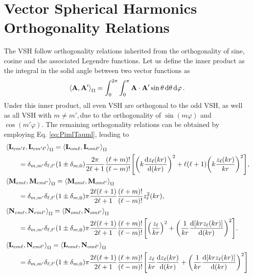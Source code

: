 \section*{Vector Spherical Harmonics Orthogonality Relations}

The VSH follow orthogonality relations inherited from the orthogonality of sine, cosine and the associated Legendre functions. Let us define the inner product as the integral in the solid angle between two vector functions as
%
\begin{align}
\ev{\vb{A},\vb{A}'}_\Omega = \int_0^{2\pi}\int_0^{\pi} \vb{A}\cdot\vb{A}'\sin\theta\dd{\theta}\dd{\varphi}.
\label{eq:inner}
\end{align}
%
Under this inner product, all even VSH are orthogonal to the odd VSH, as well as all VSH  with $m\neq m', $due to the orthogonality of $\sin(m\varphi)$ and $\cos(m'\varphi)$. The remaining orthogonality relations  can be obtained by employing Eq. \eqref{eq:PimlTauml}, leading to
%
\begin{align}
&\ev{\vb{L}_{em'\ell},\vb{L}_{em'\ell'}}_\Omega = \ev{\vb{L}_{om\ell},\vb{L}_{om\ell'}}_\Omega \notag\\
	 &\hspace*{2em} =
 	\delta_{m,m'}\delta_{\ell,\ell'} (1\pm\delta_{m,0})
 	\frac{2\pi}{2\ell+1}\frac{(\ell+m)!}{(\ell-m)!}
 	\qty[\qty(k\dv{z_\ell(kr)}{(kr)})^2 + \ell(\ell+1)\qty(k\frac{z_\ell(kr)}{kr})^2],
    \label{eq:LL}\\
%
&\ev{\vb{M}_{em\ell},\vb{M}_{em\ell'}}_\Omega = \ev{\vb{M}_{om\ell},\vb{M}_{om\ell'}}_\Omega \notag\\
		 &\hspace*{2em} =
	\delta_{m,m'}\delta_{\ell,\ell'} (1\pm\delta_{m,0})
	\pi \frac{2  \ell(\ell+1)}{2\ell+1}\frac{(\ell+m)!}{(\ell-m)!}
	z_{\ell}^2(kr),\\
%
&\ev{\vb{N}_{em\ell},\vb{N}_{em\ell'}}_\Omega = \ev{\vb{N}_{om\ell},\vb{N}_{om\ell'}}_\Omega  \notag\\
	 &\hspace*{2em} =
	 \delta_{m,m'}\delta_{\ell,\ell'} (1\pm\delta_{m,0})
	\pi \frac{2  \ell(\ell+1)}{2\ell+1}\frac{(\ell+m)!}{(\ell-m)!}
	\qty[\qty(\frac{ z_{\ell}}{kr})^2 + \qty(\frac{1}{kr}\dv{[kr z_\ell(kr)]}{(kr)})^2]. \\
&\ev{\vb{L}_{em\ell},\vb{N}_{em\ell'}}_\Omega = \ev{\vb{L}_{om\ell},\vb{N}_{om\ell'}}_\Omega \notag\\
	 &\hspace*{2em} =
	 \delta_{m,m'}\delta_{\ell,\ell'} (1\pm\delta_{m,0})
	\pi \frac{2  \ell(\ell+1)}{2\ell+1}\frac{(\ell+m)!}{(\ell-m)!}
	\qty[\frac{ z_{\ell}}{kr}\dv{z_\ell(kr)}{(kr)} + \qty(\frac{1}{kr}\dv{[kr z_\ell(kr)]}{(kr)})^2]
    \label{eq:LM}
\end{align}
